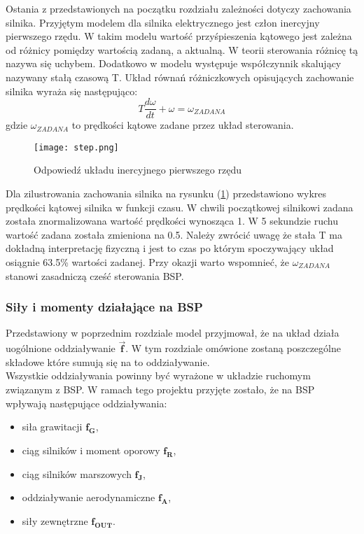 Ostania z przedstawionych na początku rozdziału zależności dotyczy zachowania silnika. Przyjętym modelem dla silnika elektrycznego jest człon inercyjny pierwszego rzędu. W takim modelu wartość przyśpieszenia kątowego jest zależna od różnicy pomiędzy wartością zadaną, a aktualną. W teorii sterowania różnicę tą nazywa się uchybem. Dodatkowo w modelu występuje współczynnik skalujący nazywany stałą czasową T. Układ równań różniczkowych opisujących zachowanie silnika wyraża się następująco:
 \[
	T \frac{d\omega}{dt} + \omega = \omega_{ZADANA}
\]
gdzie $\omega_{ZADANA}$ to prędkości kątowe zadane przez układ sterowania. 

\begin{figure}[!h]
   	\centering
      	\texttt{[image: step.png]}
      	\caption{Odpowiedź układu inercyjnego pierwszego rzędu}
      	\label{rotor_step}
\end{figure}

Dla zilustrowania zachowania silnika na rysunku (\ref{rotor_step}) przedstawiono wykres prędkości kątowej silnika w funkcji czasu. W chwili początkowej silnikowi zadana została znormalizowana wartość prędkości wynosząca 1. W 5 sekundzie ruchu wartość zadana została zmieniona na 0.5. Należy zwrócić uwagę że stała T ma dokładną interpretację fizyczną i jest to czas po którym spoczywający układ osiągnie 63.5\% wartości zadanej. Przy okazji warto wspomnieć, że $\omega_{ZADANA}$ stanowi zasadniczą cześć sterowania BSP.

\subsubsection{Siły i momenty działające na BSP}

Przedstawiony w poprzednim rozdziale model przyjmował, że na układ działa uogólnione oddziaływanie $\bm{\vec{f}}$. W tym rozdziale omówione zostaną poszczególne składowe które sumują się na to oddziaływanie.\\

Wszystkie oddziaływania powinny być wyrażone w układzie ruchomym związanym z BSP. W ramach tego projektu przyjęte zostało, że na BSP wpływają następujące oddziaływania:
\begin{itemize}
  \item {
    siła grawitacji  $\bm{f_G}$,
  }
  \item{   
    ciąg silników i moment oporowy  $\bm{f_R}$,
   }
    \item{   
    ciąg silników marszowych  $\bm{f_J}$,
   }
    \item{   
    oddziaływanie aerodynamiczne $\bm{f_A}$,
   }
    \item{   
   siły zewnętrzne $\bm{f_{OUT}}$.
   }
\end{itemize}

